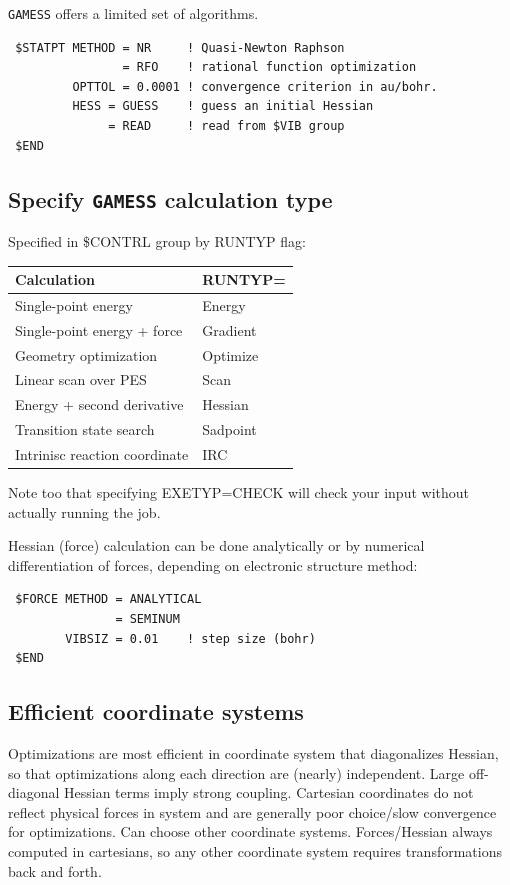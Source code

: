 \documentclass[11pt]{article}
\begin{document}
\texttt{GAMESS} offers a limited set of algorithms.
\begin{verbatim}
 $STATPT METHOD = NR     ! Quasi-Newton Raphson
                = RFO    ! rational function optimization
         OPTTOL = 0.0001 ! convergence criterion in au/bohr.
         HESS = GUESS    ! guess an initial Hessian
              = READ     ! read from $VIB group
 $END
\end{verbatim}

\subsection{Specify \texttt{GAMESS} calculation type}
\label{sec:org2dfaa8b}
Specified in \$CONTRL group by RUNTYP flag:

\begin{center}
\begin{tabular}{ll}
Calculation & RUNTYP=\\
\hline
Single-point energy & Energy\\
Single-point energy + force & Gradient\\
Geometry optimization & Optimize\\
Linear scan over PES & Scan\\
Energy + second derivative & Hessian\\
Transition state search & Sadpoint\\
Intrinisc reaction coordinate & IRC\\
\end{tabular}
\end{center}

Note too that specifying EXETYP=CHECK will check your input without actually running the job.

Hessian (force) calculation can be done analytically or by numerical differentiation of forces, depending on electronic structure method:
\begin{verbatim}
 $FORCE METHOD = ANALYTICAL
               = SEMINUM
        VIBSIZ = 0.01    ! step size (bohr)
 $END
\end{verbatim}

\subsection{Efficient coordinate systems}
\label{sec:orgb557da0}
Optimizations are most efficient in coordinate system that diagonalizes Hessian, so that optimizations along each direction are (nearly) independent.  Large off-diagonal Hessian terms imply strong coupling.  Cartesian coordinates do not reflect physical forces in system and are generally poor choice/slow convergence for optimizations. Can choose other coordinate systems. Forces/Hessian always computed in cartesians, so any other coordinate system requires transformations back and forth.
\end{document}
